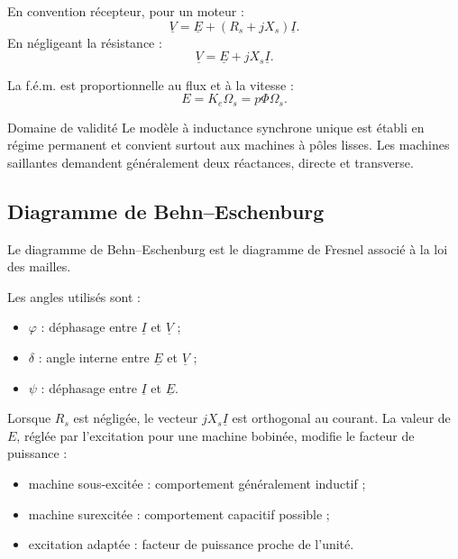 En convention récepteur, pour un moteur :
\[
\boxed{\underline V=\underline E+(R_s+jX_s)\underline I.}
\]
En négligeant la résistance :
\[
\boxed{\underline V=\underline E+jX_s\underline I.}
\]

La f.é.m. est proportionnelle au flux et à la vitesse :
\[
\boxed{E=K_e\Omega_s=p\Phi\Omega_s.}
\]

\begin{TLMachineWarning}{Domaine de validité}
Le modèle à inductance synchrone unique est établi en régime permanent et convient surtout aux machines à pôles lisses. Les machines saillantes demandent généralement deux réactances, directe et transverse.
\end{TLMachineWarning}

\subsection{Diagramme de Behn--Eschenburg}

Le diagramme de Behn--Eschenburg est le diagramme de Fresnel associé à la loi des mailles.

\begin{center}\TLDiagrammeBehnEschenburg\end{center}

Les angles utilisés sont :
\begin{itemize}
  \item $\varphi$ : déphasage entre $\underline I$ et $\underline V$ ;
  \item $\delta$ : angle interne entre $\underline E$ et $\underline V$ ;
  \item $\psi$ : déphasage entre $\underline I$ et $\underline E$.
\end{itemize}

Lorsque $R_s$ est négligée, le vecteur $jX_s\underline I$ est orthogonal au courant. La valeur de $E$, réglée par l'excitation pour une machine bobinée, modifie le facteur de puissance :
\begin{itemize}
  \item machine sous-excitée : comportement généralement inductif ;
  \item machine surexcitée : comportement capacitif possible ;
  \item excitation adaptée : facteur de puissance proche de l'unité.
\end{itemize}

